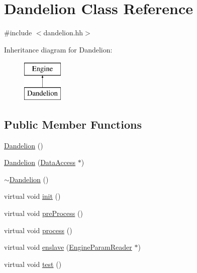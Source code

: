 \hypertarget{classDandelion}{
\section{Dandelion Class Reference}
\label{classDandelion}
}


{\ttfamily \#include $<$dandelion.hh$>$}

Inheritance diagram for Dandelion:\begin{figure}[H]
\begin{center}
\leavevmode
\includegraphics[height=2cm]{classDandelion}
\end{center}
\end{figure}
\subsection*{Public Member Functions}
\begin{DoxyCompactItemize}
\item 
\hyperlink{classDandelion_a8acd2b60d257ea45b85db1b0313c5fc2}{Dandelion} ()
\item 
\hyperlink{classDandelion_a94b7ff6276f9b31f3c1d25472480a062}{Dandelion} (\hyperlink{classDataAccess}{DataAccess} $\ast$)
\item 
\hyperlink{classDandelion_a48cd43f23ee97a671a5d5f55199545cb}{$\sim$Dandelion} ()
\item 
virtual void \hyperlink{classDandelion_a6c58019c7b1d8fb5a80c2031afb01374}{init} ()
\item 
virtual void \hyperlink{classDandelion_a21fa4068a4293d3c5068d53627e49393}{preProcess} ()
\item 
virtual void \hyperlink{classDandelion_a3de169eab0899f277a3747a57c94bb0b}{process} ()
\item 
virtual void \hyperlink{classDandelion_ac95a20aaaff8170c4539e047cb7a551a}{enslave} (\hyperlink{classEngineParamReader}{EngineParamReader} $\ast$)
\item 
virtual void \hyperlink{classDandelion_aad49aeddeaaf1aa98da869d94777e130}{test} ()
\end{DoxyCompactItemize}
